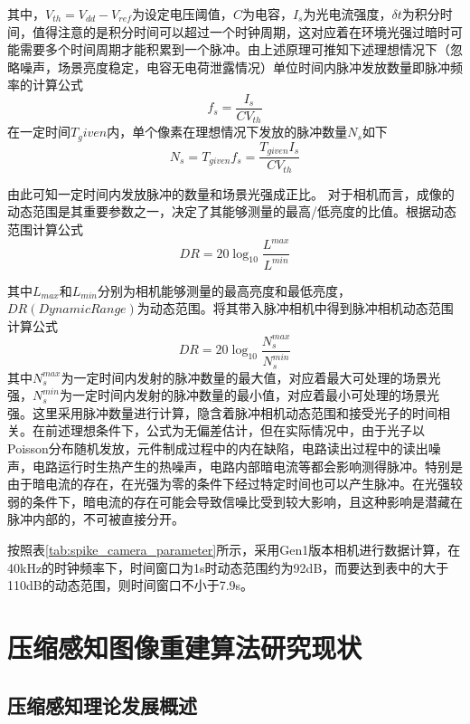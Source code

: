 其中，$V_{th} = V_{dd} - V_{ref}$为设定电压阈值，$C$为电容，$I_s$为光电流强度，$\delta t$为积分时间，值得注意的是积分时间可以超过一个时钟周期，这对应着在环境光强过暗时可能需要多个时间周期才能积累到一个脉冲。由上述原理可推知下述理想情况下（忽略噪声，场景亮度稳定，电容无电荷泄露情况）单位时间内脉冲发放数量即脉冲频率的计算公式
\begin{equation}
  \label{eq:5}
    f_s = \frac{I_s}{CV_{th}}
\end{equation}
在一定时间$T_given$内，单个像素在理想情况下发放的脉冲数量$N_{s}$如下
\begin{equation}
  \label{eq:6}
    N_{s} = T_{given} f_s = \frac{T_{given} I_s}{CV_{th}}
\end{equation}

由此可知一定时间内发放脉冲的数量和场景光强成正比。
对于相机而言，成像的动态范围是其重要参数之一，决定了其能够测量的最高/低亮度的比值。根据动态范围计算公式
\begin{equation}
  \label{eq:7}
    DR = 20 \log_{10} \frac{L^{max}}{L^{min}}
\end{equation}

其中$L_{max}$和$L_{min}$分别为相机能够测量的最高亮度和最低亮度，$DR(Dynamic Range)$为动态范围。将其带入脉冲相机中得到脉冲相机动态范围计算公式
\begin{equation}
  \label{eq:8}
    DR = 20 \log_{10} \frac{N^{max}_s}{N^{min}_s}
\end{equation}
其中$N^{max}_s$为一定时间内发射的脉冲数量的最大值，对应着最大可处理的场景光强，$N^{min}_s$为一定时间内发射的脉冲数量的最小值，对应着最小可处理的场景光强。这里采用脉冲数量进行计算，隐含着脉冲相机动态范围和接受光子的时间相关。在前述理想条件下，公式为无偏差估计，但在实际情况中，由于光子以Poisson分布随机发放，元件制成过程中的内在缺陷，电路读出过程中的读出噪声，电路运行时生热产生的热噪声，电路内部暗电流等都会影响测得脉冲。特别是由于暗电流的存在，在光强为零的条件下经过特定时间也可以产生脉冲。在光强较弱的条件下，暗电流的存在可能会导致信噪比受到较大影响，且这种影响是潜藏在脉冲内部的，不可被直接分开。

按照表\ref{tab:spike_camera_parameter}所示，采用Gen1版本相机进行数据计算，在40kHz的时钟频率下，时间窗口为1s时动态范围约为92dB，而要达到表中的大于110dB的动态范围，则时间窗口不小于7.9s。


\section{压缩感知图像重建算法研究现状}
\subsection{压缩感知理论发展概述}

